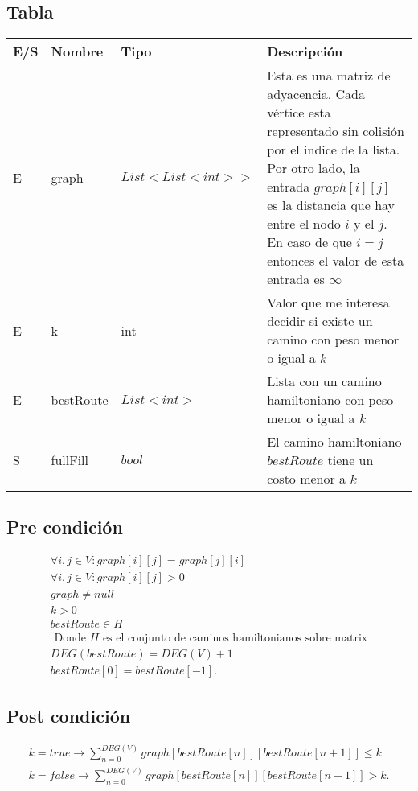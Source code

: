\documentclass{report}
\begin{document}
\section{}

\subsection{Tabla}

\noindent \begin{tabularx}{\textwidth}{@{} l X X X @{}}
\toprule
\textbf{E/S} & \textbf{Nombre} & \textbf{Tipo} & \textbf{Descripción} \\
\midrule
E
& graph
& $List<List<int>>$
& Esta es una matriz de adyacencia. Cada vértice esta representado sin colisión por el indice de la lista. Por otro lado, la entrada $graph[i][j]$ es la distancia que hay entre el nodo $i$ y el $j$. En caso de que $i = j$ entonces el valor de esta entrada es  $\infty$ \\
E
& k
& int
& Valor que me interesa decidir si existe un camino con peso menor o igual a $k$\\
E
& bestRoute
& $List<int>$
& Lista con un camino hamiltoniano con peso menor o igual a $k$\\
S
& fullFill
& $bool$
& El camino hamiltoniano $bestRoute$ tiene un costo menor a  $k$\\
\bottomrule
\end{tabularx}

\subsection{Pre condición}
\begin{align*}
  \forall i, j \in V: graph[i][j] = graph[j][i]\\
  \forall i, j \in V: graph[i][j] >  0\\
  graph \neq null\\
  k > 0\\
  bestRoute \in H\\ \text{ Donde }H\text{ es el conjunto de caminos hamiltonianos sobre matrix}\\
  DEG(bestRoute) = DEG(V) + 1\\
  bestRoute[0] = bestRoute[-1]
.\end{align*}

\subsection{Post condición}

\begin{align*}
  k = true \to \sum_{n=0}^{DEG(V)} graph[bestRoute[n]][bestRoute[n + 1]] \le k\\
  k = false \to \sum_{n=0}^{DEG(V)} graph[bestRoute[n]][bestRoute[n + 1]] > k
.\end{align*}
\end{document}
